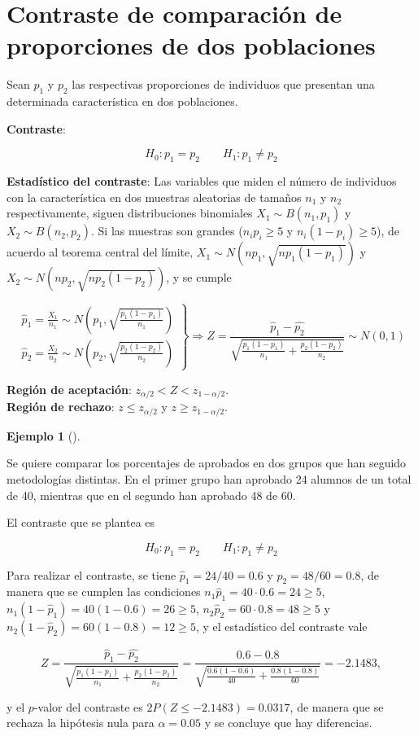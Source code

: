 \documentclass[
  spanish,
  a4paper,
]{scrreport}
\theoremstyle{plain}
\theoremstyle{definition}
\newtheorem{example}{Ejemplo}[chapter]
\theoremstyle{definition}
\theoremstyle{remark}
\begin{document}
\section{Contraste de comparación de proporciones de dos
poblaciones}\label{contraste-de-comparaciuxf3n-de-proporciones-de-dos-poblaciones}

Sean \(p_1\) y \(p_2\) las respectivas proporciones de individuos que
presentan una determinada característica en dos poblaciones.

\textbf{Contraste}:

\[
H_0: p_1=p_2\qquad H_1: p_1\neq p_2
\]

\textbf{Estadístico del contraste}: Las variables que miden el número de
individuos con la característica en dos muestras aleatorias de tamaños
\(n_1\) y \(n_2\) respectivamente, siguen distribuciones binomiales
\(X_1\sim B(n_1,p_1)\) y \(X_2\sim B(n_2,p_2)\). Si las muestras son
grandes (\(n_ip_i\geq 5\) y \(n_i(1-p_i)\geq 5\)), de acuerdo al teorema
central del límite, \(X_1\sim N(np_1,\sqrt{np_1(1-p_1)})\) y
\(X_2\sim N(np_2,\sqrt{np_2(1-p_2)})\), y se cumple

\[
\left.
\begin{array}{l}
\hat{p}_1=\frac{X_1}{n_1} \sim N\left(p_1,\sqrt{\frac{p_1(1-p_1)}{n_1}}\right) \\
\hat{p}_2=\frac{X_2}{n_2} \sim N\left(p_2,\sqrt{\frac{p_2(1-p_2)}{n_2}}\right)
\end{array}
\right\}
\Rightarrow Z = \frac{\hat{p}_1-\hat{p_2}}{\sqrt{\frac{p_1(1-p_1)}{n_1}+\frac{p_2(1-p_2)}{n_2}}}\sim N(0,1)
\]

\textbf{Región de aceptación}: \(z_{\alpha/2}< Z < z_{1-\alpha/2}\).\\
\textbf{Región de rechazo}: \(z\leq z_{\alpha/2}\) y
\(z\geq z_{1-\alpha/2}\).

\begin{example}[]\protect\hypertarget{exm-contraste-diferencia-proporciones}{}\label{exm-contraste-diferencia-proporciones}

Se quiere comparar los porcentajes de aprobados en dos grupos que han
seguido metodologías distintas. En el primer grupo han aprobado 24
alumnos de un total de 40, mientras que en el segundo han aprobado 48 de
60.

El contraste que se plantea es

\[
H_0: p_1=p_2\qquad H_1: p_1\neq p_2
\]

Para realizar el contraste, se tiene \(\hat{p}_1=24/40= 0.6\) y
\(\hat{p}_2=48/60=0.8\), de manera que se cumplen las condiciones
\(n_1\hat{p}_1=40\cdot 0.6=24\geq 5\),
\(n_1(1-\hat{p}_1)=40(1-0.6)=26\geq 5\),
\(n_2\hat{p}_2=60\cdot 0.8=48\geq 5\) y
\(n_2(1-\hat{p}_2)=60(1-0.8)=12\geq 5\), y el estadístico del contraste
vale

\[
Z = \frac{\hat{p}_1-\hat{p_2}}{\sqrt{\frac{p_1(1-p_1)}{n_1}+\frac{p_2(1-p_2)}{n_2}}} = \frac{0.6-0.8}{\sqrt{\frac{0.6(1-0.6)}{40}+\frac{0.8(1-0.8)}{60}}} = -2.1483,
\]

y el \(p\)-valor del contraste es \(2P(Z\leq -2.1483)= 0.0317\), de
manera que se rechaza la hipótesis nula para \(\alpha=0.05\) y se
concluye que hay diferencias.

\end{example}
\end{document}
